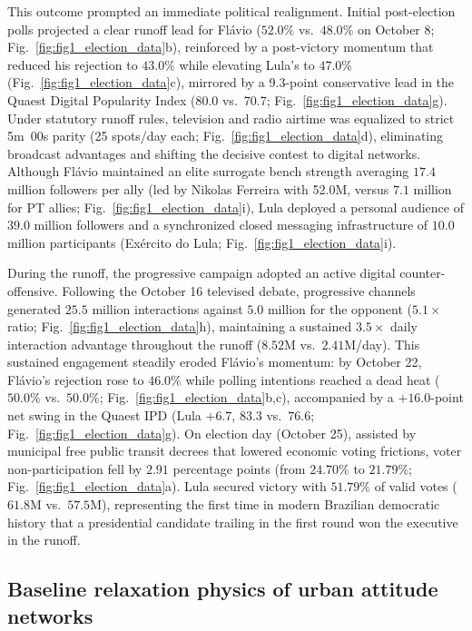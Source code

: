 \documentclass[11pt,a4paper]{article}
\begin{document}
This outcome prompted an immediate political realignment. Initial post-election polls projected a clear runoff lead for Flávio ($52.0\%$ vs.\ $48.0\%$ on October 8; Fig.~\ref{fig:fig1_election_data}b), reinforced by a post-victory momentum that reduced his rejection to $43.0\%$ while elevating Lula's to $47.0\%$ (Fig.~\ref{fig:fig1_election_data}c), mirrored by a 9.3-point conservative lead in the Quaest Digital Popularity Index (80.0 vs.\ 70.7; Fig.~\ref{fig:fig1_election_data}g). Under statutory runoff rules, television and radio airtime was equalized to strict 5m~00s parity (25 spots/day each; Fig.~\ref{fig:fig1_election_data}d), eliminating broadcast advantages and shifting the decisive contest to digital networks. Although Flávio maintained an elite surrogate bench strength averaging $17.4$ million followers per ally (led by Nikolas Ferreira with 52.0M, versus $7.1$ million for PT allies; Fig.~\ref{fig:fig1_election_data}i), Lula deployed a personal audience of $39.0$ million followers and a synchronized closed messaging infrastructure of $10.0$ million participants (Exército do Lula; Fig.~\ref{fig:fig1_election_data}i).

During the runoff, the progressive campaign adopted an active digital counter-offensive. Following the October 16 televised debate, progressive channels generated $25.5$ million interactions against $5.0$ million for the opponent ($5.1\times$ ratio; Fig.~\ref{fig:fig1_election_data}h), maintaining a sustained $3.5\times$ daily interaction advantage throughout the runoff ($8.52$M vs.\ $2.41$M/day). This sustained engagement steadily eroded Flávio's momentum: by October 22, Flávio's rejection rose to $46.0\%$ while polling intentions reached a dead heat ($50.0\%$ vs.\ $50.0\%$; Fig.~\ref{fig:fig1_election_data}b,c), accompanied by a $+16.0$-point net swing in the Quaest IPD (Lula $+6.7$, $83.3$ vs.\ $76.6$; Fig.~\ref{fig:fig1_election_data}g). On election day (October 25), assisted by municipal free public transit decrees that lowered economic voting frictions, voter non-participation fell by $2.91$ percentage points (from $24.70\%$ to $21.79\%$; Fig.~\ref{fig:fig1_election_data}a). Lula secured victory with $51.79\%$ of valid votes ($61.8$M vs.\ $57.5$M), representing the first time in modern Brazilian democratic history that a presidential candidate trailing in the first round won the executive in the runoff.

\subsection*{Baseline relaxation physics of urban attitude networks}
\end{document}
